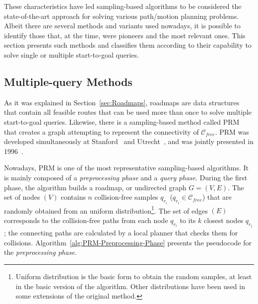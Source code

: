 These characteristics have led sampling-based algorithms to be considered the
state-of-the-art approach for solving various path/motion planning problems.
Albeit there are several methods and variants used nowadays, it is possible to
identify those that, at the time, were pioneers and the most relevant ones. This
section presents such methods and classifies them according to their capability
to solve single or multiple start-to-goal queries.

\subsection{Multiple-query Methods}

As it was explained in Section~\ref{sec:Roadmaps}, roadmaps are data structures
that contain all feasible routes that can be used more than once to solve
multiple start-to-goal queries. Likewise, there is a sampling-based method
called \ac{PRM} that creates a graph attempting to represent the connectivity of
$\mathcal{C}_{free}$. \ac{PRM} was developed simultaneously at
Stanford~\cite{Kavraki1994,Kavraki1994a} and Utrecht~\cite{Overmars1994}, and
was jointly presented in 1996~\cite{Kavraki1996}.

Nowadays, \ac{PRM} is one of the most representative sampling-based algorithms.
It is mainly composed of a \textit{preprocessing phase} and a \textit{query
phase}. During the first phase, the algorithm builds a roadmap, or undirected
graph $G=(V,E)$. The set of nodes $(V)$ contains $n$ collision-free samples
$q_{r_i}$ (\ie $q_{r_i} \in \mathcal{C}_{free}$) that are randomly obtained from
an uniform distribution\footnote{Uniform distribution is the basic form to
obtain the random samples, at least in the basic version of the algorithm.
Other distributions have been used in some extensions of the original method.}.
The set of edges $(E)$ corresponds to the collision-free paths from each node
$q_{r_i}$ to its $k$ closest nodes $q_{r_j}$; the connecting paths are
calculated by a local planner that checks them for collisions.
Algorithm~\ref{alg:PRM-Preprocessing-Phase} presents the pseudocode for the
\textit{preprocessing phase}.

